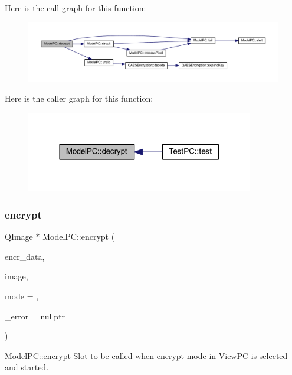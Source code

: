 Here is the call graph for this function\+:
\nopagebreak
\begin{figure}[H]
\begin{center}
\leavevmode
\includegraphics[width=350pt]{class_model_p_c_af1f0b21565bf39808c4cdd448fad0ea8_cgraph}
\end{center}
\end{figure}
Here is the caller graph for this function\+:
\nopagebreak
\begin{figure}[H]
\begin{center}
\leavevmode
\includegraphics[width=282pt]{class_model_p_c_af1f0b21565bf39808c4cdd448fad0ea8_icgraph}
\end{center}
\end{figure}
\mbox{\label{class_model_p_c_a8ef76567bc0c0307b4e2547c46536e51}} 
\subsubsection{\texorpdfstring{encrypt}{encrypt}}
{\footnotesize\ttfamily Q\+Image $\ast$ Model\+P\+C\+::encrypt (\begin{DoxyParamCaption}\item[{Q\+Byte\+Array}]{encr\+\_\+data,  }\item[{Q\+Image $\ast$}]{image,  }\item[{int}]{mode = {},  }\item[{Q\+String $\ast$}]{\+\_\+error = {\ttfamily nullptr} }\end{DoxyParamCaption})\hspace{0.3cm}{\ttfamily [slot]}}



\mbox{\hyperlink{class_model_p_c_a8ef76567bc0c0307b4e2547c46536e51}{Model\+P\+C\+::encrypt}} Slot to be called when encrypt mode in \mbox{\hyperlink{class_view_p_c}{View\+PC}} is selected and started. 


